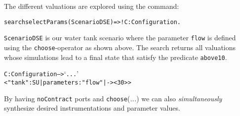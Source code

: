 \begin{example}
\noindent The different valuations are explored using the command:

\small
\begin{alltt}
  search selectParams(ScenarioDSE)  =>! C:Configuration .
\end{alltt}
\normalsize

\texttt{ScenarioDSE} is our water tank scenario where the parameter \texttt{flow} is defined using the \texttt{choose}-operator as shown above.
The search returns all valuations whose simulations lead to a final state that satisfy the predicate \texttt{above10}.
\small
\begin{alltt}
C:Configuration --> `...'
  < "tank" : SU | parameters : "flow" |-> < 30 > >
\end{alltt}
\normalsize

\end{example}

By having \texttt{noContract} ports and \texttt{choose}(\emph{...}) we can also \emph{simultaneously} synthesize desired instrumentations and parameter values.





